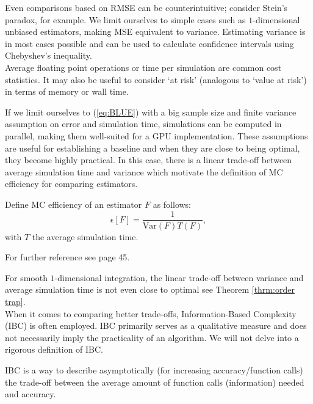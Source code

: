 \documentclass[a4paper,12pt]{article}
\begin{document}
Even comparisons based on RMSE can be counterintuitive; consider Stein's paradox,
for example. We limit ourselves to simple cases such as $1$-dimensional
unbiased estimators, making MSE equivalent to variance.
Estimating variance is in most cases possible and can be used to calculate
confidence intervals using Chebyshev's inequality.\\

Average floating point operations or time per simulation are common cost statistics.
It may also be useful to consider \enquote*{at risk}  (analogous to \enquote*{value at risk})
in terms of memory or wall time.

If we limit ourselves to (\ref{eq:BLUE}) with a big sample size and
finite variance assumption on error and simulation time,
simulations can be computed in parallel, making them well-suited for a GPU implementation.
These assumptions are useful for establishing a baseline and
when they are close to being optimal, they become highly practical.
In this case, there is a linear trade-off
between average simulation time and variance which motivate
the definition of MC efficiency for comparing estimators.

\begin{definition}
  Define MC efficiency of an
  estimator $F$ as follows:
  \begin{equation}
    \epsilon[F]=\frac{1}{\text{Var}(F) T(F)},
  \end{equation}
  with $T$ the average simulation time.
\end{definition}

\begin{related}
  For further reference see \cite{veach_robust_1997} page 45.
\end{related}

For smooth $1$-dimensional integration, the linear trade-off between
variance and average simulation time is not even close to optimal see
Theorem \ref{thrm:order trap}. \\
When it comes to comparing better trade-offs,
Information-Based Complexity (IBC) is often employed.
IBC primarily serves as a
qualitative measure and does not necessarily imply the
practicality of an algorithm. We will not delve into a
rigorous definition of IBC.

\begin{definition}
  IBC is a way to describe asymptotically (for increasing accuracy/function calls)
  the trade-off between the average amount of function calls (information)
  needed and accuracy.
\end{definition}
\end{document}
